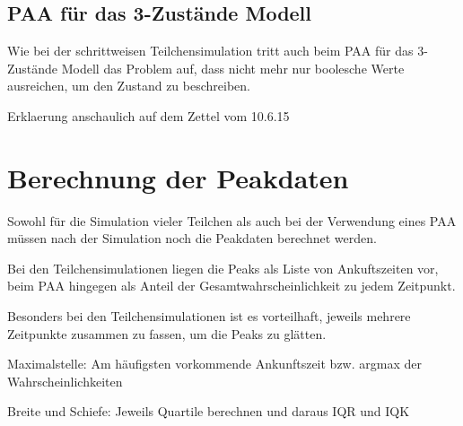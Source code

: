\subsection{PAA für das 3-Zustände Modell}
Wie bei der schrittweisen Teilchensimulation tritt auch beim PAA für das 3-Zustände Modell das Problem auf, dass nicht mehr nur boolesche Werte  ausreichen, um den Zustand zu beschreiben. 

Erklaerung anschaulich auf dem Zettel vom 10.6.15


\section{Berechnung der Peakdaten}
Sowohl für die Simulation vieler Teilchen als auch bei der Verwendung eines PAA müssen nach der Simulation noch die Peakdaten berechnet werden. 

Bei den Teilchensimulationen liegen die Peaks als Liste von Ankuftszeiten vor, beim PAA hingegen als Anteil der Gesamtwahrscheinlichkeit zu jedem Zeitpunkt. 

Besonders bei den Teilchensimulationen ist es vorteilhaft, jeweils mehrere Zeitpunkte zusammen zu fassen, um die Peaks zu glätten.

Maximalstelle: Am häufigsten vorkommende Ankunftszeit bzw. argmax der Wahrscheinlichkeiten

Breite und Schiefe: Jeweils Quartile berechnen und daraus IQR und IQK